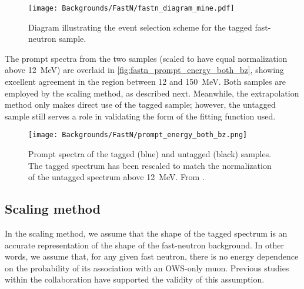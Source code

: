 \documentclass[../thesis.tex]{subfiles}
\begin{document}
\begin{figure}[h]
  \texttt{[image: Backgrounds/FastN/fastn\_diagram\_mine.pdf]}
  \caption{Diagram illustrating the event selection scheme for the tagged fast-neutron sample.}
  \label{fig:fastn_selection_diagram}
\end{figure}

The prompt spectra from the two samples (scaled to have equal normalization above 12~MeV) are overlaid in \autoref{fig:fastn_prompt_energy_both_bz}, showing excellent agreement in the region between 12 and 150~MeV. Both samples are employed by the scaling method, as described next. Meanwhile, the extrapolation method only makes direct use of the tagged sample; however, the untagged sample still serves a role in validating the form of the fitting function used.

\begin{figure}[h]
  \texttt{[image: Backgrounds/FastN/prompt\_energy\_both\_bz.png]}
  \caption{Prompt spectra of the tagged (blue) and untagged (black) samples. The tagged spectrum has been rescaled to match the normalization of the untagged spectrum above 12~MeV. From \cite{fastn}.}
  \label{fig:fastn_prompt_energy_both_bz}
\end{figure}

\subsection{Scaling method}
\label{sec:fastn_scaling}

In the scaling method, we assume that the shape of the tagged spectrum is an accurate representation of the shape of the fast-neutron background. In other words, we assume that, for any given fast neutron, there is no energy dependence on the probability of its association with an OWS-only muon. Previous studies within the collaboration have supported the validity of this assumption.

\def\emax{\ensuremath{E_\mathrm{max}}} \def\ntag{\ensuremath{N_\mathrm{tag}}}
\def\nuntag{\ensuremath{N_\mathrm{untag}}}
\end{document}
